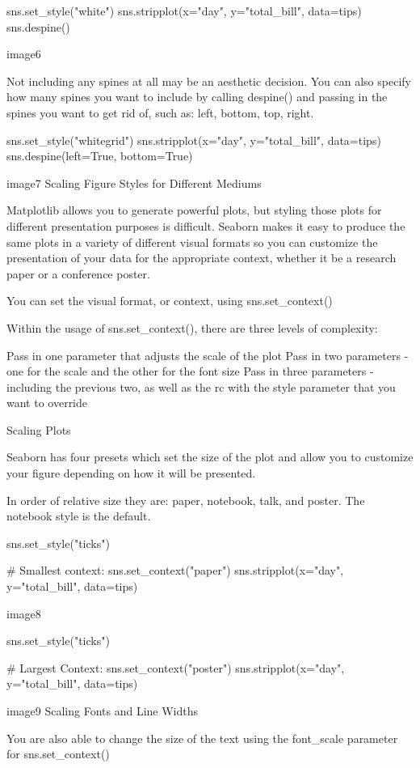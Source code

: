 \documentclass{journal}
\begin{document}
sns.set_style("white")
sns.stripplot(x="day", y="total_bill", data=tips)
sns.despine()

image6

Not including any spines at all may be an aesthetic decision. You can also specify how many spines you want to include by calling despine() and passing in the spines you want to get rid of, such as: left, bottom, top, right.

sns.set_style("whitegrid")
sns.stripplot(x="day", y="total_bill", data=tips)
sns.despine(left=True, bottom=True)

image7
Scaling Figure Styles for Different Mediums

Matplotlib allows you to generate powerful plots, but styling those plots for different presentation purposes is difficult. Seaborn makes it easy to produce the same plots in a variety of different visual formats so you can customize the presentation of your data for the appropriate context, whether it be a research paper or a conference poster.

You can set the visual format, or context, using sns.set_context()

Within the usage of sns.set_context(), there are three levels of complexity:

    Pass in one parameter that adjusts the scale of the plot
    Pass in two parameters - one for the scale and the other for the font size
    Pass in three parameters - including the previous two, as well as the rc with the style parameter that you want to override

Scaling Plots

Seaborn has four presets which set the size of the plot and allow you to customize your figure depending on how it will be presented.

In order of relative size they are: paper, notebook, talk, and poster. The notebook style is the default.

sns.set_style("ticks")

# Smallest context:
sns.set_context("paper")
sns.stripplot(x="day", y="total_bill", data=tips)

image8

sns.set_style("ticks")

# Largest Context:
sns.set_context("poster")
sns.stripplot(x="day", y="total_bill", data=tips)

image9
Scaling Fonts and Line Widths

You are also able to change the size of the text using the font_scale parameter for sns.set_context()
\end{document}
